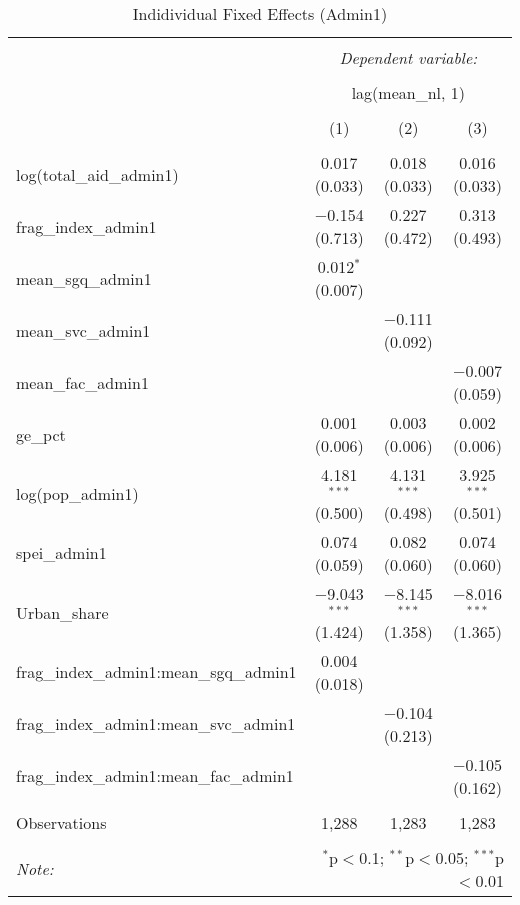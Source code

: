 
\begin{table}[!htbp] \centering 
  \caption{Indidividual Fixed Effects (Admin1)} 
  \label{} 
\begin{tabular}{@{\extracolsep{5pt}}lccc} 
\\[-1.8ex]\hline 
\hline \\[-1.8ex] 
 & \multicolumn{3}{c}{\textit{Dependent variable:}} \\ 
\cline{2-4} 
\\[-1.8ex] & \multicolumn{3}{c}{lag(mean\_nl, 1)} \\ 
\\[-1.8ex] & (1) & (2) & (3)\\ 
\hline \\[-1.8ex] 
 log(total\_aid\_admin1) & 0.017 (0.033) & 0.018 (0.033) & 0.016 (0.033) \\ 
  frag\_index\_admin1 & $-$0.154 (0.713) & 0.227 (0.472) & 0.313 (0.493) \\ 
  mean\_sgq\_admin1 & 0.012$^{*}$ (0.007) &  &  \\ 
  mean\_svc\_admin1 &  & $-$0.111 (0.092) &  \\ 
  mean\_fac\_admin1 &  &  & $-$0.007 (0.059) \\ 
  ge\_pct & 0.001 (0.006) & 0.003 (0.006) & 0.002 (0.006) \\ 
  log(pop\_admin1) & 4.181$^{***}$ (0.500) & 4.131$^{***}$ (0.498) & 3.925$^{***}$ (0.501) \\ 
  spei\_admin1 & 0.074 (0.059) & 0.082 (0.060) & 0.074 (0.060) \\ 
  Urban\_share & $-$9.043$^{***}$ (1.424) & $-$8.145$^{***}$ (1.358) & $-$8.016$^{***}$ (1.365) \\ 
  frag\_index\_admin1:mean\_sgq\_admin1 & 0.004 (0.018) &  &  \\ 
  frag\_index\_admin1:mean\_svc\_admin1 &  & $-$0.104 (0.213) &  \\ 
  frag\_index\_admin1:mean\_fac\_admin1 &  &  & $-$0.105 (0.162) \\ 
 \hline \\[-1.8ex] 
Observations & 1,288 & 1,283 & 1,283 \\ 
\hline 
\hline \\[-1.8ex] 
\textit{Note:}  & \multicolumn{3}{r}{$^{*}$p$<$0.1; $^{**}$p$<$0.05; $^{***}$p$<$0.01} \\ 
\end{tabular} 
\end{table} 

